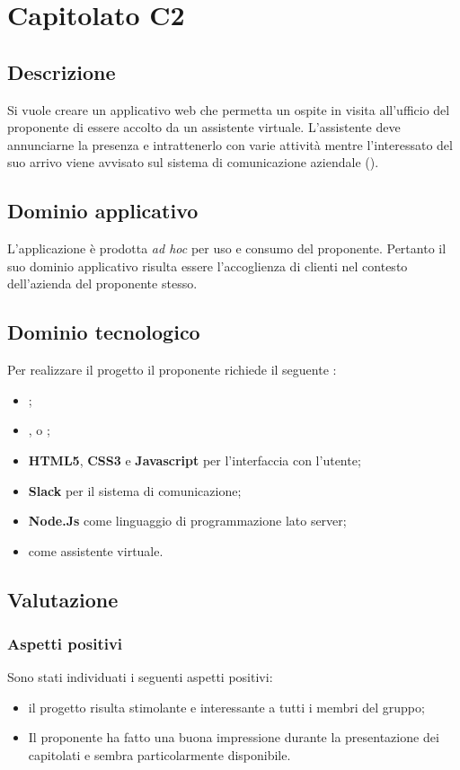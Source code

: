 \documentclass[../StudioDiFattibilita.tex]{subfiles}
\begin{document}
	\section{Capitolato C2}
		\subsection{Descrizione}
		Si vuole creare un applicativo web che permetta un ospite in visita all'ufficio del proponente di essere accolto da un assistente virtuale. L'assistente deve annunciarne la presenza e intrattenerlo con varie attività mentre l'interessato del suo arrivo viene avvisato sul sistema di comunicazione aziendale ().
		\subsection{Dominio applicativo}
			L'applicazione è prodotta \textit{ad hoc} per uso e consumo del proponente. Pertanto il suo dominio applicativo risulta essere l'accoglienza di clienti nel contesto dell'azienda del proponente stesso.
		\subsection{Dominio tecnologico}
			Per realizzare il progetto il proponente richiede il seguente :
		\begin{itemize}
			\item \textbf{}; 
			\item \textbf{}, \textbf{} o \textbf{};
			\item \textbf{HTML5}, \textbf{CSS3} e \textbf{Javascript} per l'interfaccia con l'utente;
			\item \textbf{Slack} per il sistema di comunicazione;
			\item \textbf{Node.Js} \textbf{} come linguaggio di programmazione lato server;
			\item \textbf{} \textbf{} come assistente virtuale.
		\end{itemize}
		\subsection{Valutazione}
			\subsubsection{Aspetti positivi}
			Sono stati individuati i seguenti aspetti positivi:
			\begin{itemize}
				\item il progetto risulta stimolante e interessante a tutti i membri del gruppo;
				\item Il proponente ha fatto una buona impressione durante la presentazione dei capitolati e sembra particolarmente disponibile.
			\end{itemize}
\end{document}
